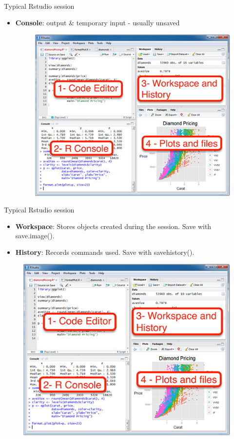 \documentclass[
  ignorenonframetext,
]{beamer}
\providecommand{\tightlist}{%
  \setlength{\itemsep}{0pt}\setlength{\parskip}{0pt}}
\begin{document}
\begin{frame}{Typical Rstudio session}
\label{typical-rstudio-session-1}
\begin{itemize}
\tightlist
\item
  \textbf{Console}: output \& temporary input - usually unsaved

  \begin{figure}
  \includegraphics[width=0.5\linewidth]{fig/Rstudio} \end{figure}
\end{itemize}
\end{frame}

\begin{frame}{Typical Rstudio session}
\label{typical-rstudio-session-2}
\begin{itemize}
\tightlist
\item
  \textbf{Workspace}: Stores objects created during the session. Save
  with save.image().
\item
  \textbf{History}: Records commands used. Save with savehistory().
\end{itemize}

\begin{figure}
\includegraphics[width=0.5\linewidth]{fig/Rstudio} \end{figure}
\end{frame}
\end{document}
